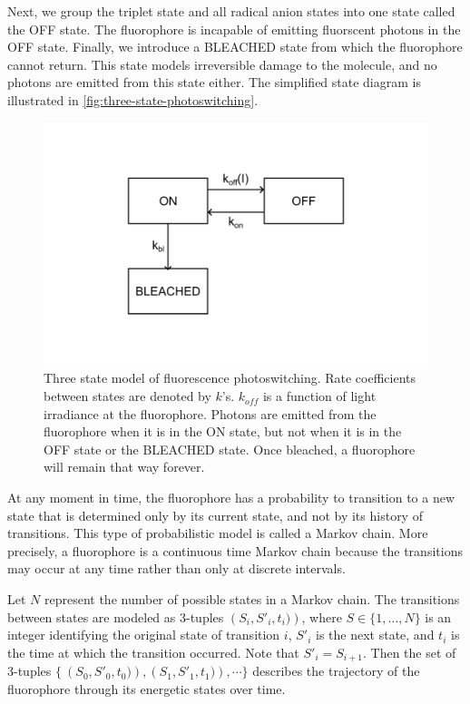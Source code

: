 \documentclass[10pt,a4paper]{book}
\begin{document}
Next, we group the triplet state and all radical anion states into one state called the OFF state. The fluorophore is incapable of emitting fluorscent photons in the OFF state. Finally, we introduce a BLEACHED state from which the fluorophore cannot return. This state models irreversible damage to the molecule, and no photons are emitted from this state either. The simplified state diagram is illustrated in \autoref{fig:three-state-photoswitching}.

\begin{figure}[ht]
    \centering
    \includegraphics{three-state-photoswitching-model.png}
    \caption{Three state model of fluorescence photoswitching. Rate coefficients between states are denoted by $k$'s. $k_{off}$ is a function of light irradiance at the fluorophore. Photons are emitted from the fluorophore when it is in the ON state, but not when it is in the OFF state or the BLEACHED state. Once bleached, a fluorophore will remain that way forever.}
    \label{fig:three-state-photoswitching}
\end{figure}

At any moment in time, the fluorophore has a probability to transition to a new state that is determined only by its current state, and not by its history of transitions. This type of probabilistic model is called a Markov chain. More precisely, a fluorophore is a continuous time Markov chain because the transitions may occur at any time rather than only at discrete intervals.

Let $N$ represent the number of possible states in a Markov chain. The transitions between states are modeled as 3-tuples $\left(S_{i}, S'_{i}, t_i)\right)$, where $S \in \{ 1, \ldots, N \} $ is an integer identifying the original state of transition $i$, $S'_{i}$ is the next state, and $t_i$ is the time at which the transition occurred. Note that $S'_{i} = S_{i + 1}$. Then the set of 3-tuples $\{\ \left(S_{0}, S'_{0}, t_0)\right), \left(S_{1}, S'_{1}, t_{1})\right), \cdots \}$ describes the trajectory of the fluorophore through its energetic states over time.
\end{document}
